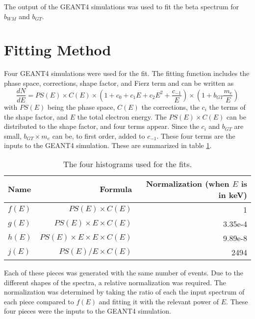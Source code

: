 \documentclass[../MaxHughesThesis.tex]{subfiles}
\begin{document}
The output of the GEANT4 simulations was used to fit the beta spectrum for $b_{WM}$ and $b_{GT}$.

\section{Fitting Method}
Four GEANT4 simulations were used for the fit.
The fitting function includes the phase space, corrections, shape factor, and Fierz term and can be written as
\begin{equation}
	\frac{dN}{dE}= PS(E) \times C(E) \times (1 + c_{0} + c_{1} E + c_{2} E^{2} + \frac{c_{-1}}{E}) \times (1 + b_{GT}\frac{m_{e}}{E})
	\label{eq:betaspecwshape}
\end{equation}
with $PS(E)$ being the phase space, $C(E)$ the corrections, the $c_{i}$ the terms of the shape factor, and $E$ the total electron energy. 
The $PS(E)\times C(E)$ can be distributed to the shape factor, and four terms appear.
Since the $c_{i}$ and $b_{GT}$ are small, $b_{GT} \times m_{e}$ can be, to first order, added to $c_{-1}$. 
These four terms are the inputs to the GEANT4 simulation.
These are summarized in table \ref{tab:4histfit}.

\begin{table}[!hbt]
	\centering
	\caption{The four histograms used for the fits.}
		\begin{tabular}{lrr}
		Name & Formula & Normalization (when $E$ is in keV) \\ \hline
		$f(E)$ & $PS(E) \times C(E)$ & 1 \\
		$g(E)$ & $PS(E) \times E \times C(E)$ & 3.35e-4 \\
		$h(E)$ &  $PS(E)  \times E \times E \times C(E)$ & 9.89e-8 \\
		$j(E)$ &  $PS(E)/E \times C(E)$ & 2494 
		\end{tabular}
		\label{tab:4histfit}
\end{table}

Each of these pieces was generated with the same number of events.
Due to the different shapes of the spectra, a relative normalization was required.
The normalization was determined by taking the ratio of each the input spectrum of each piece compared to $f(E)$ and fitting it with the relevant power of $E$. 
These four pieces were the inputs to the GEANT4 simulation.
\end{document}
